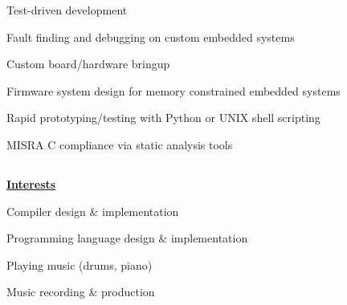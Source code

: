 \documentclass[6pt]{article}
\begin{document}
\begin{minipage}{13em}
\noindent
\begin{flushleft}
\begin{itemize}
{\small
    \item Test-driven development
    \item Fault finding and debugging on custom embedded systems
    \item Custom board/hardware bringup
    \item Firmware system design for memory constrained embedded systems
    \item Rapid prototyping/testing with Python or UNIX shell scripting
    \item MISRA C compliance via static analysis tools
}
\end{itemize}
\end{flushleft}

\subsection*{}
{\underline{\textbf{Interests}}}

\noindent
\begin{flushleft}
\begin{itemize}
{\small
    \item Compiler design \& implementation
    \item Programming language design \& implementation
    \item Playing music (drums, piano)
    \item Music recording \& production
}
\end{itemize}
\end{flushleft}
\end{minipage}
\hspace*{2em}
%
\end{document}

